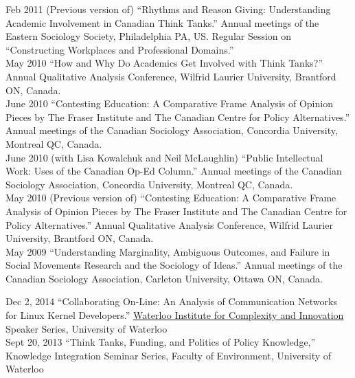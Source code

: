 \documentclass[9pt,usenames,dvipsnames]{article}
\begin{document}
\ind Feb 2011 (Previous version of) ``Rhythms and Reason Giving: Understanding Academic Involvement in Canadian Think Tanks.'' Annual meetings of the Eastern Sociology Society, Philadelphia PA, US. Regular Session on ``Constructing Workplaces and Professional Domains.''\\

\ind May 2010 ``How and Why Do Academics Get Involved with Think Tanks?'' Annual Qualitative Analysis Conference, Wilfrid Laurier University, Brantford ON, Canada.\\

\ind June 2010 ``Contesting Education: A Comparative Frame Analysis of Opinion Pieces by The Fraser Institute and The Canadian Centre for Policy Alternatives.'' Annual meetings  of the Canadian Sociology Association, Concordia University, Montreal QC, Canada.\\

\ind June 2010 (with Lisa Kowalchuk and Neil McLaughlin) ``Public Intellectual Work: Uses of the Canadian Op-Ed Column.'' Annual meetings of the Canadian Sociology Association, Concordia University, Montreal QC, Canada.\\

\ind May 2010 (Previous version of) ``Contesting Education: A Comparative Frame Analysis of Opinion Pieces by The Fraser Institute and The Canadian Centre for Policy Alternatives.'' Annual Qualitative Analysis Conference, Wilfrid Laurier University, Brantford ON, Canada.\\

\ind May 2009 ``Understanding Marginality, Ambiguous Outcomes, and Failure in Social Movements Research and the Sociology of Ideas.'' Annual meetings of the Canadian Sociology Association, Carleton University, Ottawa ON, Canada.\\

\smallskip
{}

\ind Dec 2, 2014 ``Collaborating On-Line: An Analysis of Communication Networks for Linux Kernel Developers.'' \href{http://wici.ca/}{Waterloo Institute for Complexity and Innovation} Speaker Series, University of Waterloo \\


\ind Sept 20, 2013 ``Think Tanks, Funding, and Politics of Policy Knowledge,'' Knowledge Integration Seminar Series, Faculty of Environment, University of Waterloo \\

\end{document}
